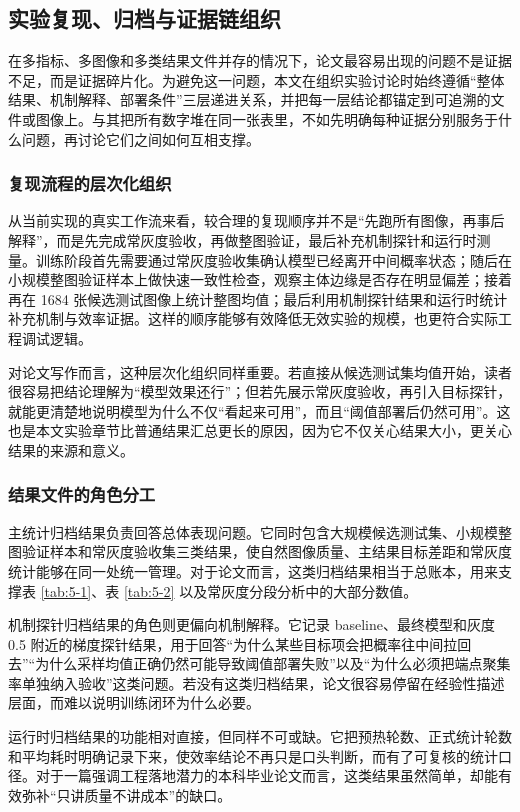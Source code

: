\documentclass[thesis]{../zstucs-graduation-project}
\begin{document}
\subsection{实验复现、归档与证据链组织}
在多指标、多图像和多类结果文件并存的情况下，论文最容易出现的问题不是证据不足，而是证据碎片化。为避免这一问题，本文在组织实验讨论时始终遵循“整体结果、机制解释、部署条件”三层递进关系，并把每一层结论都锚定到可追溯的文件或图像上。与其把所有数字堆在同一张表里，不如先明确每种证据分别服务于什么问题，再讨论它们之间如何互相支撑。

\subsubsection{复现流程的层次化组织}
从当前实现的真实工作流来看，较合理的复现顺序并不是“先跑所有图像，再事后解释”，而是先完成常灰度验收，再做整图验证，最后补充机制探针和运行时测量。训练阶段首先需要通过常灰度验收集确认模型已经离开中间概率状态；随后在小规模整图验证样本上做快速一致性检查，观察主体边缘是否存在明显偏差；接着再在 1684 张候选测试图像上统计整图均值；最后利用机制探针结果和运行时统计补充机制与效率证据。这样的顺序能够有效降低无效实验的规模，也更符合实际工程调试逻辑。

对论文写作而言，这种层次化组织同样重要。若直接从候选测试集均值开始，读者很容易把结论理解为“模型效果还行”；但若先展示常灰度验收，再引入目标探针，就能更清楚地说明模型为什么不仅“看起来可用”，而且“阈值部署后仍然可用”。这也是本文实验章节比普通结果汇总更长的原因，因为它不仅关心结果大小，更关心结果的来源和意义。

\subsubsection{结果文件的角色分工}
主统计归档结果负责回答总体表现问题。它同时包含大规模候选测试集、小规模整图验证样本和常灰度验收集三类结果，使自然图像质量、主结果目标差距和常灰度统计能够在同一处统一管理。对于论文而言，这类归档结果相当于总账本，用来支撑表 \ref{tab:5-1}、表 \ref{tab:5-2} 以及常灰度分段分析中的大部分数值。

机制探针归档结果的角色则更偏向机制解释。它记录 baseline、最终模型和灰度 0.5 附近的梯度探针结果，用于回答“为什么某些目标项会把概率往中间拉回去”“为什么采样均值正确仍然可能导致阈值部署失败”以及“为什么必须把端点聚集率单独纳入验收”这类问题。若没有这类归档结果，论文很容易停留在经验性描述层面，而难以说明训练闭环为什么必要。

运行时归档结果的功能相对直接，但同样不可或缺。它把预热轮数、正式统计轮数和平均耗时明确记录下来，使效率结论不再只是口头判断，而有了可复核的统计口径。对于一篇强调工程落地潜力的本科毕业论文而言，这类结果虽然简单，却能有效弥补“只讲质量不讲成本”的缺口。
\end{document}
